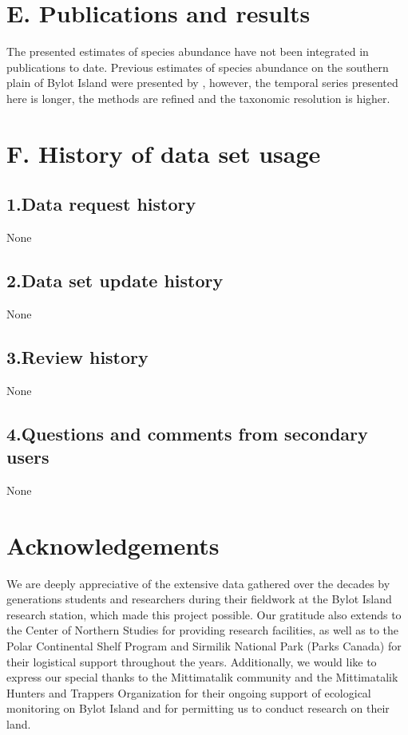 \documentclass[a4paper,twoside,12pt]{article}
\begin{document}
       
    \section*{E. Publications and results}
The presented estimates of species abundance have not been integrated in publications to date. Previous estimates of species abundance on the southern plain of Bylot Island were presented by \citet{legagneux2012}, however, the temporal series presented here is longer, the methods are refined and the taxonomic resolution is higher.
   
   \section*{F. History of data set usage}
       \subsection*{1.Data request history} None
       \subsection*{2.Data set update history} None
       \subsection*{3.Review history}  None
       \subsection*{4.Questions and comments from secondary users} None
   
   \section*{Acknowledgements}
We are deeply appreciative of the extensive data gathered over the decades by generations students and researchers during their fieldwork at the Bylot Island research station, which made this project possible. Our gratitude also extends to the Center of Northern Studies for providing research facilities, as well as to the Polar Continental Shelf Program and Sirmilik National Park (Parks Canada) for their logistical support throughout the years. Additionally, we would like to express our special thanks to the Mittimatalik community and the Mittimatalik Hunters and Trappers Organization for their ongoing support of ecological monitoring on Bylot Island and for permitting us to conduct research on their land.
   
\clearpage

\end{document}
